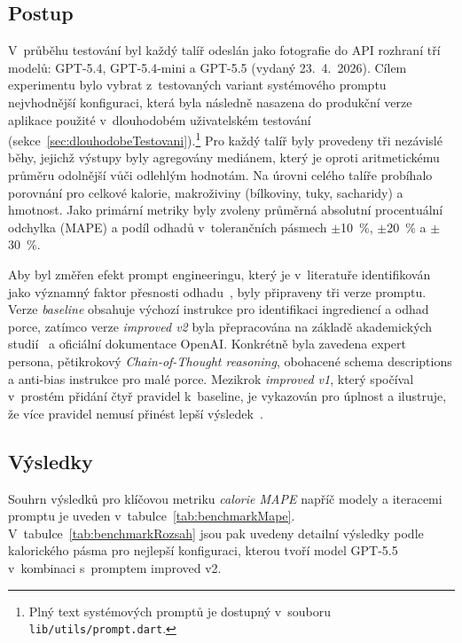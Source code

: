 \subsection{Postup}
\label{subsec:benchmarkPostup}
V~průběhu testování byl každý talíř odeslán jako fotografie do API rozhraní tří modelů: GPT-5.4, GPT-5.4-mini a GPT-5.5 (vydaný 23.~4.~2026).
Cílem experimentu bylo vybrat z~testovaných variant systémového promptu nejvhodnější konfiguraci, která byla následně nasazena do produkční verze aplikace použité v~dlouhodobém uživatelském testování (sekce~\ref{sec:dlouhodobeTestovani}).\footnote{Plný text systémových promptů je dostupný v~souboru \texttt{lib/utils/prompt.dart}.}
Pro každý talíř byly provedeny tři nezávislé běhy, jejichž výstupy byly agregovány mediánem, který je oproti aritmetickému průměru odolnější vůči odlehlým hodnotám.
Na úrovni celého talíře probíhalo porovnání pro celkové kalorie, makroživiny (bílkoviny, tuky, sacharidy) a hmotnost.
Jako primární metriky byly zvoleny průměrná absolutní procentuální odchylka (MAPE) a podíl odhadů v~tolerančních pásmech $\pm$10~\%, $\pm$20~\% a $\pm$30~\%.

Aby byl změřen efekt prompt engineeringu, který je v~literatuře identifikován jako významný faktor přesnosti odhadu~\cite{coburn2025multimodalNutrition,hua2025nutribench}, byly připraveny tři verze promptu.
Verze \emph{baseline} obsahuje výchozí instrukce pro identifikaci ingrediencí a odhad porce, zatímco verze \emph{improved v2} byla přepracována na základě akademických studií~\cite{fridolfsson2025llmNutrition,coburn2025multimodalNutrition,hua2025nutribench} a oficiální dokumentace OpenAI. Konkrétně byla zavedena expert persona, pětikrokový \emph{Chain-of-Thought reasoning}, obohacené schema descriptions a anti-bias instrukce pro malé porce.
Mezikrok \emph{improved v1}, který spočíval v~prostém přidání čtyř pravidel k~baseline, je vykazován pro úplnost a ilustruje, že více pravidel nemusí přinést lepší výsledek~\cite{ase2025structuredPrompts}.

\subsection{Výsledky}
\label{subsec:benchmarkVysledky}
Souhrn výsledků pro klíčovou metriku \emph{calorie MAPE} napříč modely a iteracemi promptu je uveden v~tabulce~\ref{tab:benchmarkMape}.
V~tabulce~\ref{tab:benchmarkRozsah} jsou pak uvedeny detailní výsledky podle kalorického pásma pro nejlepší konfiguraci, kterou tvoří model GPT-5.5 v~kombinaci s~promptem improved v2.

